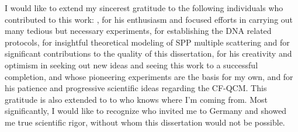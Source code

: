 I would like to extend my sincerest gratitude to the following individuals
who contributed to this work: , for his enthusiasm and
focused efforts in carrying out many tedious but necessary experiments,
 for establishing the DNA related protocols,
 for insightful theoretical modeling of SPP multiple
scattering and for significant contributions to the quality of this
dissertation,  for his creativity and optimism in
seeking out new ideas and seeing this work to a successful completion,
 and  whose pioneering
experiments are the basis for my own, and  for his patience
and progressive scientific ideas regarding the CF-QCM. This gratitude is
also extended to to  who knows where I'm coming from.
Most significantly, I would like to recognize  who
invited me to Germany and showed me true scientific rigor, without whom
this dissertation would not be possible.
